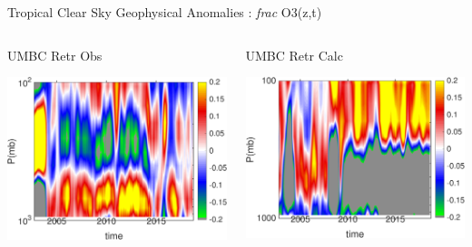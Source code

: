 \documentclass[10pt,t]{beamer}
\begin{document}
\begin{frame}{Tropical Clear Sky Geophysical Anomalies : \textit{frac} O3(z,t)}
\begin{columns}
\begin{column}{0.45\columnwidth}
\begin{block}{\footnotesize UMBC Retr Obs}
\vspace{-0.1in}
\begin{center}
\includegraphics[width=\linewidth]{Figs/ClearAnom/umbc_clr_retr_obs_o3_anom_200209_201808.png}
\end{center}
\end{block}
\end{column}

\begin{column}{0.45\columnwidth}
\begin{block}{\footnotesize UMBC Retr Calc}
\vspace{-0.1in}
\begin{center}
\includegraphics[width=\linewidth]{Figs/ClearAnom/umbc_clr_retr_cal_o3_anom_200209_201808.png}
\end{center}
\end{block}
\end{column}
\end{columns}

\end{frame}
\end{document}
